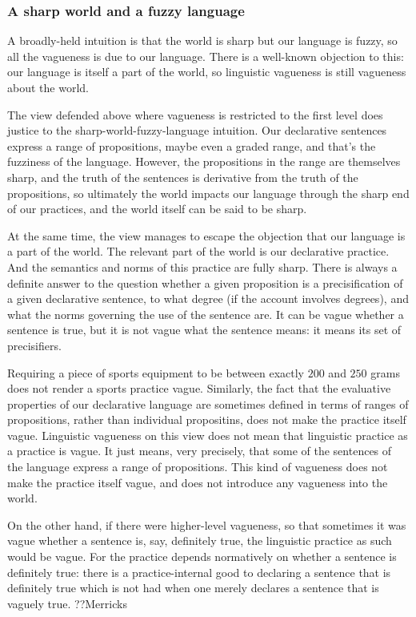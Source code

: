 \subsubsection{A sharp world and a fuzzy language}
A broadly-held intuition is that the world is sharp but our language is fuzzy, so all the vagueness is due to our language.
There is a well-known objection to this: our language is itself a part of the world, so linguistic vagueness is still vagueness
about the world. 

The view defended above where vagueness is restricted to the first level does justice to the sharp-world-fuzzy-language intuition. 
Our declarative sentences express a range of propositions, maybe even a graded range, and that's the 
fuzziness of the language. However, the propositions in the range are themselves sharp, and the truth of the sentences is
derivative from the truth of the propositions, so ultimately the world impacts our language through the sharp end of our
practices, and the world itself can be said to be sharp. 

At the same time, the view manages to escape the objection that our language is a part of the world. The relevant part of the world
is our declarative practice. And the semantics and norms of this practice are fully sharp. There is always a definite answer to 
the question whether a given proposition is a precisification of a given declarative sentence, to what degree (if the account 
involves degrees), and what the norms governing the use of the sentence are. It can be vague whether a sentence is true, but it 
is not vague what the sentence means: it means its set of precisifiers. 

Requiring a piece of sports equipment to be between exactly $200$ and $250$ grams does not render a sports practice vague.
Similarly, the fact that the evaluative properties of our declarative language are sometimes defined in terms of ranges of propositions,
rather than individual propositins, does not make the practice itself vague. Linguistic vagueness on this view does not mean that
linguistic practice as a practice is vague. It just means, very precisely, that some of the sentences of the language express a range
of propositions. This kind of vagueness does not make the practice itself vague, and does not introduce any vagueness into the world.

On the other hand, if there were higher-level vagueness, so that sometimes it was vague whether a sentence is, say, definitely true,
the linguistic practice as such would be vague. For the practice depends normatively on whether a sentence is definitely true:
there is a practice-internal good to declaring a sentence that is definitely true which is not had when one merely declares a sentence
that is vaguely true. 
??Merricks

